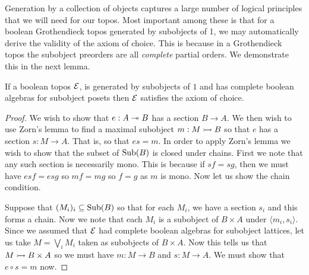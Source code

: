 Generation by a collection of objects captures a large number of
logical principles that we will need for our topos. Most important
among these is that for a boolean Grothendieck topos generated by
subobjects of 1, we may automatically derive the validity of the axiom
of choice. This is because in a Grothendieck topos the subobject
preorders are all \emph{complete} partial orders. We demonstrate this
in the next lemma.

\begin{lem}\label{lem:background:completealgebratoaoc}
  If a boolean topos $\mathcal{E}{}$, is generated by subobjects of $1$ and
  has complete boolean algebras for subobject posets then $\mathcal{E}{}$
  satisfies the axiom of choice.
\end{lem}
\begin{proof}
  We wish to show that $e : A \twoheadrightarrow B$ has a section $B \to A$. We then
  wish to use Zorn's lemma to find a maximal subobject $m : M \rightarrowtail B$
  so that $e$ has a section $s : M \to A$. That is, so that $es = m$.
  In order to apply Zorn's lemma we wish to show that the subset of
  $\operatorname{Sub}(B)$ is closed under chains. First we note that any such
  section is necessarily mono. This is because if $sf = sg$, then we
  must have $esf = esg$ so $mf = mg$ so $f = g$ as $m$ is mono. Now
  let us show the chain condition.

  Suppose that $(M_i)_i \subseteq \operatorname{Sub}(B)$ so that for each $M_i$, we
  have a section $s_i$ and this forms a chain. Now we note that each
  $M_i$ is a subobject of $B \times A$ under
  $\langle m_i, s_i \rangle$. Since we assumed that $\mathcal{E}{}$ had
  complete boolean algebras for subobject lattices, let us take
  $M = \bigvee_i M_i$ taken as subobjects of $B \times A$. Now this
  tells us that $M \rightarrowtail B \times A$ so we must have $m : M \to B$ and
  $s : M \to A$. We must show that $e \circ s = m$ now.


\end{proof}
